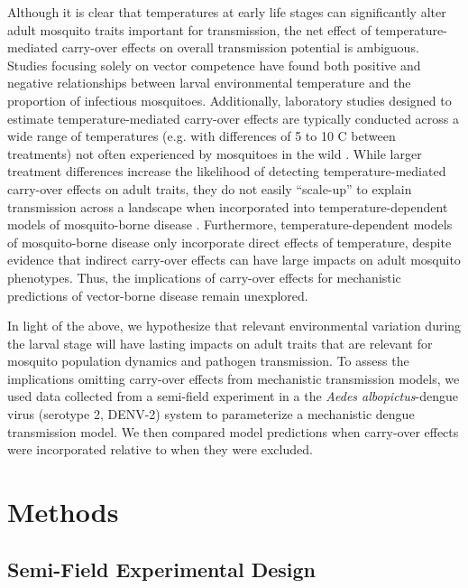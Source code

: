 \documentclass[12pt]{article}
\begin{document}
Although it is clear that temperatures at early life stages can significantly alter adult mosquito traits important for transmission, the net effect of temperature-mediated carry-over effects on overall transmission potential is ambiguous. Studies focusing solely on vector competence have found both positive \citep{muturi2011c} and negative \citep{muturi2011a} relationships between larval environmental temperature and the proportion of infectious mosquitoes. Additionally, laboratory studies designed to estimate temperature-mediated carry-over effects are typically conducted across a wide range of temperatures (e.g. with differences of 5 to 10 \degree C between treatments) not often experienced by mosquitoes in the wild \citep{cator2013}. While larger treatment differences increase the likelihood of detecting temperature-mediated carry-over effects on adult traits, they do not easily ``scale-up'' to explain transmission across a landscape when incorporated into temperature-dependent models of mosquito-borne disease \citep{pascual2006, mordecai2017, reiner2013}. Furthermore, temperature-dependent models of mosquito-borne disease only incorporate direct effects of temperature, despite evidence that indirect carry-over effects can have large impacts on adult mosquito phenotypes. Thus, the implications of carry-over effects for mechanistic predictions of vector-borne disease remain unexplored.


In light of the above, we hypothesize that relevant environmental variation during the larval stage will have lasting impacts on adult traits that are relevant for mosquito population dynamics and pathogen transmission. To assess the implications omitting carry-over effects from mechanistic transmission models, we used data collected from a semi-field experiment in a the \textit{Aedes albopictus}-dengue virus (serotype 2, DENV-2) system to parameterize a mechanistic dengue transmission model. We then compared model predictions when carry-over effects were incorporated relative to when they were excluded.


\section{Methods}
\subsection{Semi-Field Experimental Design}
\end{document}
